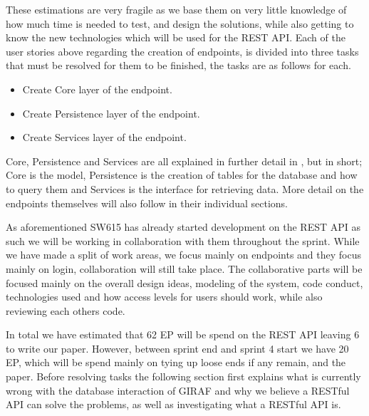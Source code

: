 These estimations are very fragile as we base them on very little knowledge of how much time is needed to test, and design the solutions, while also getting to know the new technologies which will be used for the REST API.
Each of the user stories above regarding the creation of endpoints, is divided into three tasks that must be resolved for them to be finished, the tasks are as follows for each.
\begin{itemize}
    \item Create Core layer of the endpoint.
    \item Create Persistence layer of the endpoint.
    \item Create Services layer of the endpoint.
\end{itemize}
Core, Persistence and Services are all explained in further detail in , but in short; Core is the model, Persistence is the creation of tables for the database and how to query them and Services is the interface for retrieving data.
More detail on the endpoints themselves will also follow in their individual sections.

As aforementioned SW615 has already started development on the REST API as such we will be working in collaboration with them throughout the sprint.
While we have made a split of work areas, we focus mainly on endpoints and they focus mainly on login, collaboration will still take place.
The collaborative parts will be focused mainly on the overall design ideas, modeling of the system, code conduct, technologies used and how access levels for users should work, while also reviewing each others code.

In total we have estimated that 62 EP will be spend on the REST API leaving 6 to write our paper.
However, between sprint end and sprint 4 start we have 20 EP, which will be spend mainly on tying up loose ends if any remain, and the paper.
Before resolving tasks the following section first explains what is currently wrong with the database interaction of GIRAF and why we believe a RESTful API can solve the problems, as well as investigating what a RESTful API is.